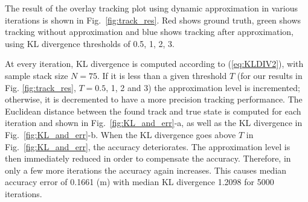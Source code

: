 













The result of the overlay tracking plot using dynamic approximation in various iterations is shown in Fig.~\ref{fig:track_res}. 
Red shows ground truth, green shows tracking without approximation and blue shows tracking after approximation, using KL divergence thresholds of 0.5, 1, 2, 3.

At every iteration, KL divergence is computed according to (\ref{eq:KLDIV2}), with sample stack size $N = 75$.  If it is less than a given threshold $T$ (for our results in Fig. \ref{fig:track_res}, $T = 0.5$, 1, 2 and 3) the approximation level is incremented; otherwise, it is decremented to have a more precision tracking performance. %
The Euclidean distance between the found track and true state is computed for each iteration and shown in Fig.~\ref{fig:KL_and_err}-a, as well as the KL divergence in Fig.~\ref{fig:KL_and_err}-b. When the KL divergence goes above $T$ in Fig.~\ref{fig:KL_and_err}, the accuracy deteriorates. The approximation level is then immediately reduced in order to compensate the accuracy. Therefore, in only a few more iterations the accuracy again increases. This causes median accuracy error of 0.1661 (m) with median KL divergence 1.2098 for 5000 iterations.

